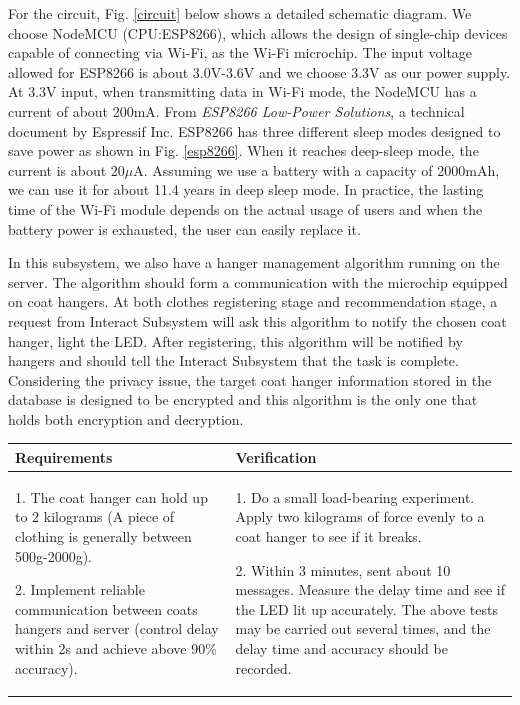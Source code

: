 For the circuit, Fig. \ref{circuit} below shows a detailed schematic diagram. We choose NodeMCU (CPU:ESP8266), which allows the design of single-chip devices capable of connecting via Wi-Fi, as the Wi-Fi microchip. The input voltage allowed for ESP8266 is about 3.0V-3.6V and we choose 3.3V as our power supply. At 3.3V input, when transmitting data in Wi-Fi mode, the NodeMCU has a current of about 200mA. From \textit{ESP8266 Low-Power Solutions}, a technical document by Espressif Inc. ESP8266 has three different sleep modes designed to save power as shown in Fig. \ref{esp8266}\cite{esp8266}. When it reaches deep-sleep mode, the current is about 20$\mu$A. Assuming we use a battery with a capacity of 2000mAh, we can use it for about 11.4 years in deep sleep mode. In practice, the lasting time of the Wi-Fi module depends on the actual usage of users and when the battery power is exhausted, the user can easily replace it.  

In this subsystem, we also have a hanger management algorithm running on the server. The algorithm should form a communication with the microchip equipped on coat hangers. At both clothes registering stage and recommendation stage, a request from Interact Subsystem will ask this algorithm to notify the chosen coat hanger, light the LED. After registering, this algorithm will be notified by hangers and should tell the Interact Subsystem that the task is complete. Considering the privacy issue, the target coat hanger information stored in the database is designed to be encrypted and this algorithm is the only one that holds both encryption and decryption.  

\begin{table}[h]
    \centering
    \begin{tabularx}{\textwidth}{|X|X|}
    \hline
    Requirements & Verification \\
    \hline
    1. The coat hanger can hold up to 2 kilograms (A piece of clothing is generally between 500g-2000g).
    
    2. Implement reliable communication between coats hangers and server (control delay within 2s and achieve above 90\% accuracy).
    & 
    1. Do a small load-bearing experiment. Apply two kilograms of force evenly to a coat hanger to see if it breaks.  
    
    2. Within 3 minutes, sent about 10 messages. Measure the delay time and see if the LED lit up accurately. The above tests may be carried out several times, and the delay time and accuracy should be recorded.
    \\
    \hline
    \end{tabularx}
\end{table}

